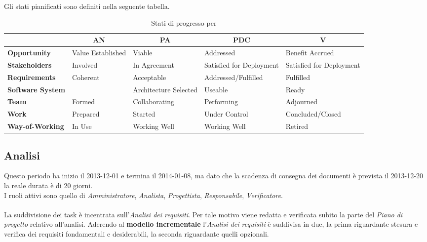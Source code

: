 Gli stati pianificati sono definiti nella seguente tabella.

\begin{table}[H]
	\begin{adjustwidth}{-4cm}{-4cm}
	\centering
	\begin{tabular}{ l l l l l }
	\hline
	&
	\multicolumn{1}{c}{\textbf{AN}} & 
	\multicolumn{1}{c}{\textbf{PA}} & 
	\multicolumn{1}{c}{\textbf{PDC}} & 
	\multicolumn{1}{c}{\textbf{V}} \\
	\hline

	\textbf{Opportunity} & Value Established & Viable & Addressed & Benefit Accrued \\
	\textbf{Stakeholders} & Involved & In Agreement & Satisfied for Deployment & Satisfied for Deployment \\
	\textbf{Requirements} & Coherent & Acceptable & Addressed/Fulfilled & Fulfilled \\
	\textbf{Software System} & & Architecture Selected & Useable & Ready \\
	\textbf{Team} & Formed & Collaborating & Performing & Adjourned \\
	\textbf{Work} & Prepared & Started & Under Control & Concluded/Closed \\
	\textbf{Way-of-Working} & In Use & Working Well & Working Well & Retired \\

	\hline
	\end{tabular}
	\caption{Stati di progresso per }
	\label{StatiSEMAT}
	\end{adjustwidth}
\end{table}

	\subsection{Analisi}

Questo periodo ha inizio il 2013-12-01 e termina il 2014-01-08, ma dato che la scadenza di consegna dei documenti è prevista il 2013-12-20 la reale durata è di 20 giorni. \\
I ruoli attivi sono quello di \textit{Amministratore}, \textit{Analista}, \textit{Progettista}, \textit{Responsabile}, \textit{Verificatore}. \\ \\
La suddivisione dei task è incentrata sull'\textit{Analisi dei requisiti}. Per tale motivo viene redatta e verificata subito la parte del \textit{Piano di progetto} relativo all'analisi.
Aderendo al \textbf{modello incrementale} l'\textit{Analisi dei requisiti} è suddivisa in due, la prima riguardante stesura e verifica dei requisiti fondamentali e desiderabili, la seconda riguardante quelli opzionali.
